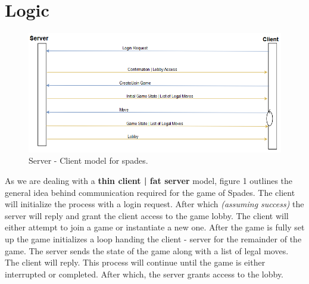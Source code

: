\documentclass[journal, a4paper]{IEEEtran}
\begin{document}
\section{Logic}
	



	
	\begin{figure}[!hbt]
		\begin{center}
		\includegraphics[width=\columnwidth]{clientServer}
		\caption{Server - Client model for spades.}
		\label{Figure 1}
		\end{center}
	\end{figure}
	
	As we are dealing with a \textbf{thin client | fat server} model, figure 1 outlines the general idea behind communication required for the game of Spades. The client will initialize the process with a login request. After which \textit{(assuming success)} the server will reply and grant the client access to the game lobby. The client will either attempt to join a game or instantiate a new one. After the game is fully set up the game initializes a loop handing the client - server for the remainder of the game. The server sends the state of the game along with a list of legal moves. The client will reply. This process will continue until the game is either interrupted or completed. After which, the server grants access to the lobby.  
	
\end{document}
